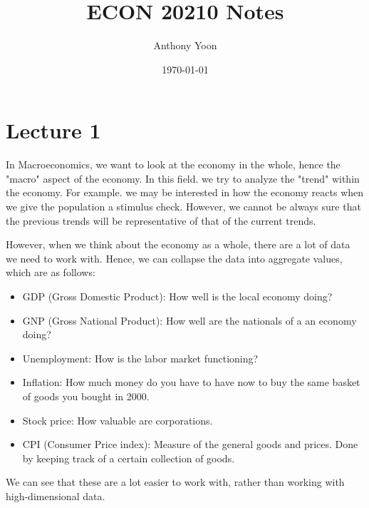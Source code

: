 \documentclass[11pt]{article}
\title{\textbf{ECON 20210 Notes}}
\author{Anthony Yoon}
\date{\today}
\begin{document}
\maketitle
\tableofcontents
\listoftodos
\newpage


\section{Lecture 1}
In Macroeconomics, we want to look at the economy in the whole, hence the "macro" aspect of the economy. In this field. we try to analyze the "trend" within the economy. For example. we may be interested in how the economy reacts when we give the population a stimulus check. However, we cannot be always sure that the previous trends will be representative of that of the current trends. 


However, when we think about the economy as a whole, there are a lot of data we need to work with. Hence, we can collapse the data into aggregate values, which are as follows:
\begin{itemize}
    \item GDP (Gross Domestic Product): How well is the local economy doing?
    \item GNP (Gross National Product): How well are the nationals of a an economy doing?
    \item Unemployment: How is the labor market functioning?
    \item Inflation: How much money do you have to have now to buy the same basket of goods you bought in 2000. 
    \item Stock price: How valuable are corporations. 
    \item CPI (Consumer Price index): Measure of the general goods and prices. Done by keeping track of a certain collection of goods. 
\end{itemize}
We can see that these are a lot easier to work with, rather than working with high-dimensional data. 
\end{document}
